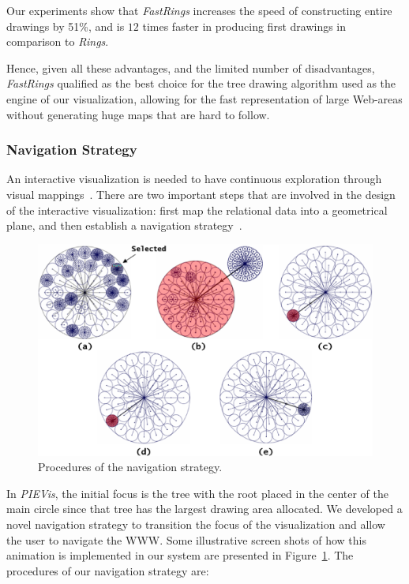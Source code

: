 \documentclass[]{article}
\begin{document}
{%

Our experiments show that {\em FastRings} increases the speed of constructing entire drawings by 51\%, and is $12$ times faster in producing first drawings in comparison to {\em Rings}.

Hence, given all these advantages, and the limited number of disadvantages, {\em FastRings} qualified as the best choice for the tree drawing algorithm used
as the engine of our visualization, allowing for the fast representation of large Web-areas without generating huge maps that are hard to follow.

\subsubsection{Navigation Strategy}
\label{se:animation}

An interactive visualization is needed to have continuous exploration through visual mappings~\cite{w-00}.
There are two important steps that are involved in the design of the interactive visualization:
first map the relational data into a geometrical plane, and then establish a navigation strategy~\cite{nh-05}.

\begin{figure}[t]
\centering
\includegraphics[width=5.5in]{images/new_animation_states3}
\caption{Procedures of the navigation strategy.}
\label{fig_animate}
\end{figure}

In {\em PIEVis}, the initial focus is the tree with the root placed in the center of the main circle since that tree has the largest drawing area allocated.  
We developed a novel navigation strategy to transition the focus of the visualization and allow the user to navigate the WWW.
Some illustrative screen shots of how this animation is implemented in our system are presented in Figure~\ref{fig_animate}.
The procedures of our navigation strategy are:

}
\end{document}
